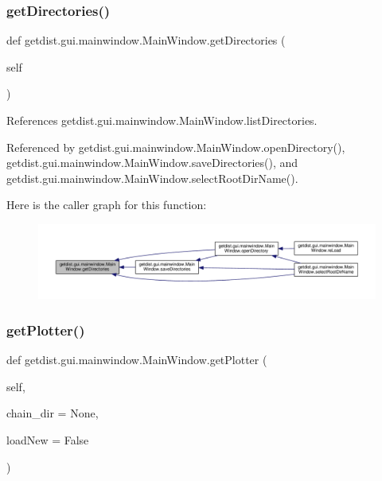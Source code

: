 \subsubsection{\texorpdfstring{get\+Directories()}{getDirectories()}}
{\footnotesize\ttfamily def getdist.\+gui.\+mainwindow.\+Main\+Window.\+get\+Directories (\begin{DoxyParamCaption}\item[{}]{self }\end{DoxyParamCaption})}



References getdist.\+gui.\+mainwindow.\+Main\+Window.\+list\+Directories.



Referenced by getdist.\+gui.\+mainwindow.\+Main\+Window.\+open\+Directory(), getdist.\+gui.\+mainwindow.\+Main\+Window.\+save\+Directories(), and getdist.\+gui.\+mainwindow.\+Main\+Window.\+select\+Root\+Dir\+Name().

Here is the caller graph for this function\+:
\nopagebreak
\begin{figure}[H]
\begin{center}
\leavevmode
\includegraphics[width=350pt]{classgetdist_1_1gui_1_1mainwindow_1_1MainWindow_aa0388a3f86e2f94a313715182b9cc2ac_icgraph}
\end{center}
\end{figure}
\mbox{\label{classgetdist_1_1gui_1_1mainwindow_1_1MainWindow_a385cc81f23347ee51f9ee4454a676074}} 
\subsubsection{\texorpdfstring{get\+Plotter()}{getPlotter()}}
{\footnotesize\ttfamily def getdist.\+gui.\+mainwindow.\+Main\+Window.\+get\+Plotter (\begin{DoxyParamCaption}\item[{}]{self,  }\item[{}]{chain\+\_\+dir = {\ttfamily None},  }\item[{}]{load\+New = {\ttfamily False} }\end{DoxyParamCaption})}



